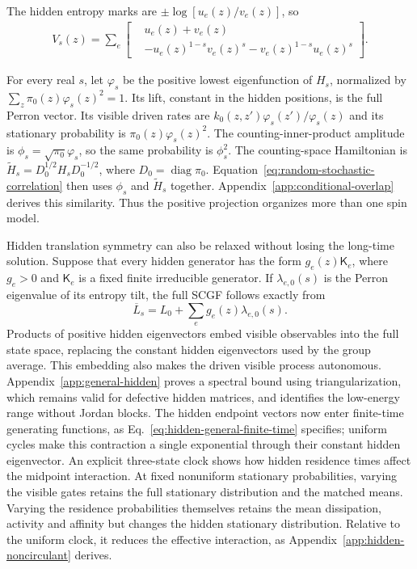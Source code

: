 \documentclass[aps,pre,reprint,amsmath,amssymb,longbibliography,floatfix]{revtex4-2}
\begin{document}
The hidden entropy marks are $\pm\log\left[u_e(z)/v_e(z)\right]$, so
\begin{equation}
 \begin{aligned}
 V_s(z)=\sum_e\left[\begin{aligned}&u_e(z)+v_e(z)\\
 &-u_e(z)^{1-s}v_e(z)^s-v_e(z)^{1-s}u_e(z)^s\end{aligned}\right].
 \end{aligned}
 \label{eq:general-visible-potential}
\end{equation}

For every real $s$, let $\varphi_s$ be the positive lowest eigenfunction
of $H_s$, normalized by $\sum_z\pi_0(z)\varphi_s(z)^2=1$.
Its lift, constant in the hidden positions, is the full Perron vector.
Its visible driven rates are
$k_0(z,z')\varphi_s(z')/\varphi_s(z)$ and its stationary probability is
$\pi_0(z)\varphi_s(z)^2$. The counting-inner-product amplitude is
$\phi_s=\sqrt{\pi_0}\varphi_s$, so the same probability is $\phi_s^2$.
The counting-space Hamiltonian is
$\widetilde H_s=D_0^{1/2}H_sD_0^{-1/2}$, where
$D_0=\operatorname{diag}\pi_0$. Equation~\eqref{eq:random-stochastic-correlation}
then uses $\phi_s$ and $\widetilde H_s$ together.
Appendix~\ref{app:conditional-overlap} derives this similarity.
Thus the positive projection organizes more than one spin model.

Hidden translation symmetry can also be relaxed without losing the
long-time solution. Suppose that every hidden generator has the form
$g_e(z)\mathsf K_e$, where $g_e>0$ and $\mathsf K_e$ is a fixed finite
irreducible generator. If $\lambda_{e,0}(s)$ is the Perron eigenvalue of
its entropy tilt, the full SCGF follows exactly from
\begin{equation}
 \overline L_s=L_0+\sum_e g_e(z)\lambda_{e,0}(s).
 \label{eq:general-hidden-main}
\end{equation}
Products of positive hidden eigenvectors embed visible observables
into the full state space, replacing the constant hidden eigenvectors
used by the group average. This embedding also makes the driven visible process autonomous.
Appendix~\ref{app:general-hidden} proves a spectral bound using
triangularization, which remains valid for defective hidden matrices,
and identifies the low-energy range without Jordan blocks.
The hidden endpoint vectors now enter finite-time generating functions,
as Eq.~\eqref{eq:hidden-general-finite-time} specifies; uniform cycles make this contraction a single exponential through
their constant hidden eigenvector.
An explicit three-state clock shows how hidden residence times affect
the midpoint interaction. At fixed nonuniform stationary probabilities,
varying the visible gates retains the full stationary distribution and
the matched means. Varying the residence probabilities themselves
retains the mean dissipation, activity and affinity but changes the
hidden stationary distribution. Relative to the uniform clock, it
reduces the effective interaction, as Appendix~\ref{app:hidden-noncirculant}
derives.
\end{document}
